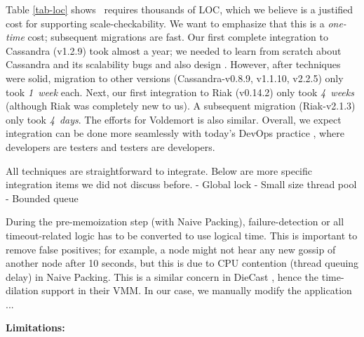 %
Table \ref{tab-loc} shows \sck\ requires thousands of LOC, which we
believe is a justified cost for supporting scale-checkability.  We want to
emphasize that this is a {\em one-time} cost; subsequent migrations are
fast.  Our first complete integration to Cassandra (v1.2.9) took almost a
year; we needed to learn from scratch about Cassandra and its scalability
bugs and also design \sck.  However, after \sck techniques were solid,
migration to other versions (Cassandra-v0.8.9, v1.1.10, v2.2.5) only took
{\em 1~week} each.  Next, our first integration to Riak (v0.14.2) only
took {\em 4~weeks} (although Riak was completely new to us).  A subsequent
migration (Riak-v2.1.3) only took {\em 4~days}.  The efforts for
Voldemort is also similar.
%
Overall, we expect \sck integration can be done more seamlessly with
today's DevOps practice \cite{Limoncelli+11-Devops}, where developers are
testers and testers are developers.







All \sck techniques are straightforward to integrate.  Below are more
specific integration items we did not discuss before.
- Global lock
- Small size thread pool
- Bounded queue
\fi

 During the pre-memoization step (with Naive
Packing), failure-detection or all timeout-related logic has to be
converted to use logical time.  This is important to remove false
positives; for example, a node might not hear any new gossip of another
node after 10 seconds, but this is due to CPU contention (thread queuing
delay) in Naive Packing.  This is a similar concern in DieCast \cite{x},
hence the time-dilation support in their VMM.  In our case, we manually
modify the application ... 
\fi









{\bf Limitations:}
\fi


